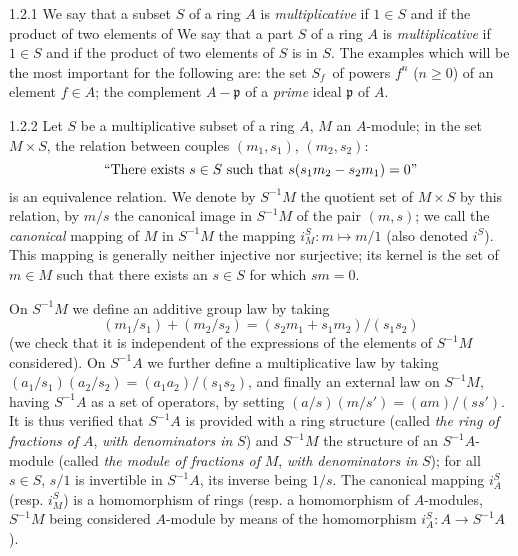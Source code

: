 \documentclass[../main.tex]{subfiles}
\begin{document}
\begin{env}{1.2.1}
We say that a subset $S$ of a ring $A$ is \emph{multiplicative} if $1\in S$ and if the product of two elements of
We say that a part $S$ of a ring $A$ is \emph{multiplicative} if $1\in S$ and if the product of two elements of
$S$ is in $S$. The examples which will be the most important for the following are:
 the set $S_f$ of powers $f^n$ ($n\geq 0$) of an element $f\in A$;
 the complement $A-\mathfrak{p}$ of a \emph{prime} ideal $\mathfrak{p}$ of $A$.
\end{env}

\begin{env}{1.2.2}
Let $S$ be a multiplicative subset of a ring $A$, $M$ an $A$-module; in the set $M\times S$, the relation between
couples $(m_1,s_1)$, $(m_2,s_2)$:
\[
   ``\text{There exists } s\in S\text{ such that } s(s_1 m_2-s_2 m_1)=0"
\]
is an equivalence relation. We denote by $S^{-1}M$ the quotient set of $M\times S$ by this relation, by $m/s$ the canonical
image in $S^{-1}M$ of the pair $(m,s)$; we call the \emph{canonical} mapping of $M$ in $S^{-1}M$ the mapping $i_M^S\colon m\mapsto m/1$
(also denoted $i^S$). This mapping is generally neither injective nor surjective; its kernel is the set of $m\in M$ such that there
exists an $s\in S$ for which $sm=0$.

On $S^{-1}M$ we define an additive group law by taking
\[
  (m_1/s_1)+(m_2/s_2)=(s_2 m_1+s_1 m_2)/(s_1 s_2)
\]
(we check that it is independent of the expressions of the elements of $S^{-1}M$ considered). On $S^{-1}A$ we further define
a multiplicative law by taking $(a_1/s_1)(a_2/s_2)=(a_1 a_2)/(s_1 s_2)$, and finally an external law on $S^{-1}M$, having
$S^{-1}A$ as a set of operators, by setting $(a/s)(m/s')=(am)/(ss')$. It is thus verified that $S^{-1}A$ is provided with a
ring structure (called \emph{the ring of fractions of} $A$, \emph{with denominators in} $S$) and $S^{-1}M$ the structure of
an $S^{-1}A$-module (called \emph{the  module of fractions of} $M$, \emph{with denominators in} $S$); for all $s\in S$,
$s/1$ is invertible in $S^{-1}A$, its inverse being $1/s$. The canonical mapping $i_A^S$ (resp. $i_M^S$) is a homomorphism
of rings (resp. a homomorphism of $A$-modules, $S^{-1}M$ being considered $A$-module by means of the homomorphism
$i_A^S\colon A\to S^{-1}A$).
\end{env}
\end{document}
